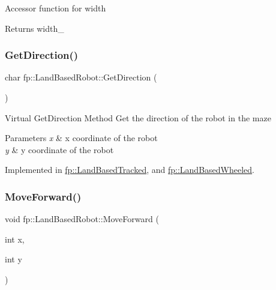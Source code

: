 Accessor function for width \begin{DoxyReturn}{Returns}
width\+\_\+ 
\end{DoxyReturn}
\mbox{\label{classfp_1_1_land_based_robot_a50841b6e40d4e92832770d26b427fea2}} 
\subsubsection{\texorpdfstring{Get\+Direction()}{GetDirection()}}
{\footnotesize\ttfamily char fp\+::\+Land\+Based\+Robot\+::\+Get\+Direction (\begin{DoxyParamCaption}{ }\end{DoxyParamCaption})\hspace{0.3cm}{\ttfamily [pure virtual]}}

Virtual Get\+Direction Method Get the direction of the robot in the maze 
\begin{DoxyParams}{Parameters}
{\em x} & x coordinate of the robot \\
\hline
{\em y} & y coordinate of the robot \\
\hline
\end{DoxyParams}


Implemented in \hyperlink{classfp_1_1_land_based_tracked_a3e6ba37a5c5bf8f2b4abb19907e5e9b8}{fp\+::\+Land\+Based\+Tracked}, and \hyperlink{classfp_1_1_land_based_wheeled_adaafaceb388374ffb9cec28301665492}{fp\+::\+Land\+Based\+Wheeled}.

\mbox{\label{classfp_1_1_land_based_robot_a25ed5c4c524e68cc983104a8da57599b}} 
\subsubsection{\texorpdfstring{Move\+Forward()}{MoveForward()}}
{\footnotesize\ttfamily void fp\+::\+Land\+Based\+Robot\+::\+Move\+Forward (\begin{DoxyParamCaption}\item[{int}]{x,  }\item[{int}]{y }\end{DoxyParamCaption})\hspace{0.3cm}{\ttfamily [pure virtual]}}

